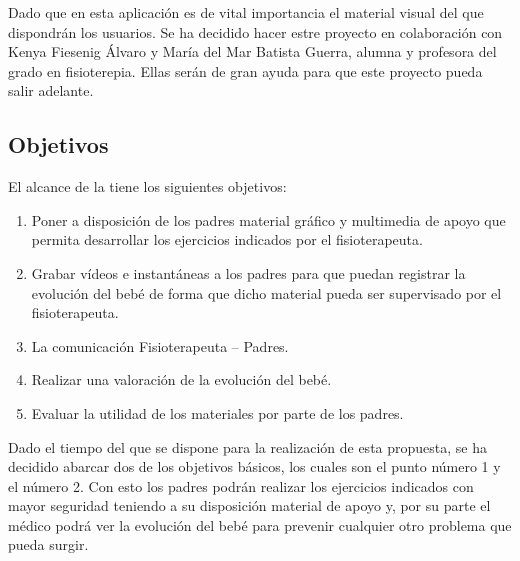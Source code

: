 \bigskip
Dado que en esta aplicación es de vital importancia el material visual del que dispondrán
los usuarios. Se ha decidido hacer estre proyecto en colaboración con Kenya Fiesenig Álvaro y
María del Mar Batista Guerra, alumna y profesora del grado en fisioterepia. Ellas serán de gran
ayuda para que este proyecto pueda salir adelante.

\bigskip
\subsection{Objetivos}
El alcance de la \textbf{\myTitle} tiene los siguientes objetivos:
\begin{enumerate}
    \item Poner a disposición de los padres material gráfico y multimedia de apoyo que permita desarrollar los ejercicios indicados por el fisioterapeuta.
    \item Grabar vídeos e instantáneas a los padres para que puedan registrar la evolución del bebé de forma que dicho material pueda ser supervisado por el fisioterapeuta.
    \item La comunicación Fisioterapeuta – Padres.
    \item Realizar una valoración de la evolución del bebé.
    \item Evaluar la utilidad de los materiales por parte de los padres.
\end{enumerate}

Dado el tiempo del que se dispone para la realización de esta propuesta, se ha decidido abarcar
dos de los objetivos básicos, los cuales son el punto número 1 y el número 2. Con esto los padres
podrán realizar los ejercicios indicados con mayor seguridad teniendo a su disposición material
de apoyo y, por su parte el médico podrá ver la evolución del bebé para prevenir cualquier otro
problema que pueda surgir.

